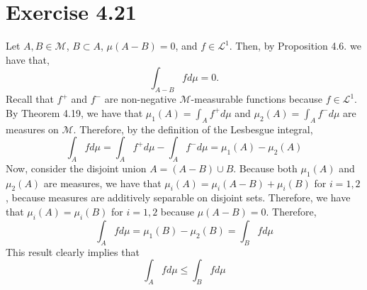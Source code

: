 \documentclass{article}
\begin{document}
  \section*{Exercise 4.21}
  Let $A, B \in \mathcal{M}$, $B \subset A$, $\mu(A - B) = 0$, and $f \in \mathscr{L}^1$. Then, by Proposition 4.6. we have that,
  \begin{equation}
    \int_{A-B} f d\mu = 0.
  \end{equation}
  Recall that $f^+$ and $f^-$ are non-negative $\mathcal{M}$-measurable functions because $f \in \mathscr{L}^1$. By Theorem 4.19, we have that $\mu_1(A) =  \int_A f^+ d\mu$ and $\mu_2(A) = \int_A f^- d\mu$ are measures on $\mathcal{M}$. Therefore, by the definition of the Lesbesgue integral,
  \begin{equation}
  	\int_A f d\mu =  \int_A f^+ d\mu -  \int_A f^- d\mu = \mu_1(A) - \mu_2(A)
  \end{equation}
  Now, consider the disjoint union $A = (A - B) \cup B$.  Because both $\mu_1(A)$ and $\mu_2(A)$ are measures, we have that $\mu_i(A) = \mu_i(A - B) + \mu_i(B)$ for $i=1,2$, because measures are additively separable on disjoint sets. Therefore, we have that $\mu_i(A) = \mu_i (B)$ for $i=1,2$ because $\mu(A - B) = 0$. Therefore,
  \begin{equation}
  	\int_A f d\mu = \mu_1(B) - \mu_2(B) = \int_B f d\mu
  \end{equation}
  This result clearly implies that
  \begin{equation}
  	\int_A f d\mu \leq \int_{B} f d\mu
  \end{equation}
\end{document}
